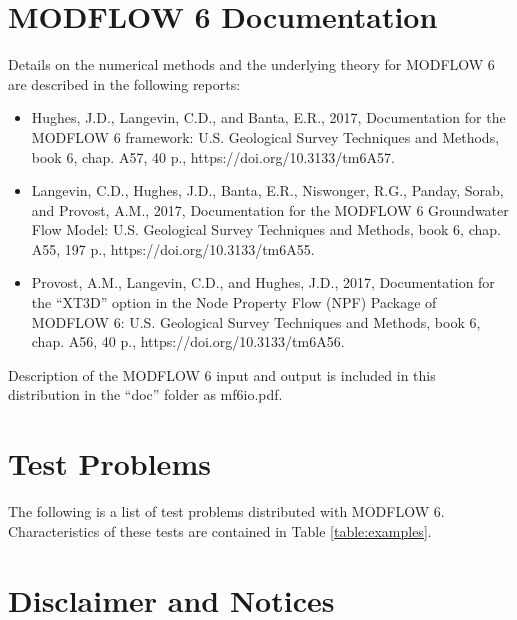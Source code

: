 \documentclass[11pt,twoside,twocolumn]{usgsreport}
\begin{document}
\section{MODFLOW 6 Documentation}
Details on the numerical methods and the underlying theory for MODFLOW 6 are described in the following reports:

\begin{itemize}
\item
Hughes, J.D., Langevin, C.D., and Banta, E.R., 2017, Documentation for the MODFLOW 6 framework: U.S. Geological Survey Techniques and Methods, book 6, chap. A57, 40 p., https://doi.org/10.3133/tm6A57.

\item
Langevin, C.D., Hughes, J.D., Banta, E.R., Niswonger, R.G., Panday, Sorab, and Provost, A.M., 2017, Documentation for the MODFLOW 6 Groundwater Flow Model: U.S. Geological Survey Techniques and Methods, book 6, chap. A55, 197 p., https://doi.org/10.3133/tm6A55.

\item
Provost, A.M., Langevin, C.D., and Hughes, J.D., 2017, Documentation for the ``XT3D'' option in the Node Property Flow (NPF) Package of MODFLOW 6: U.S. Geological Survey Techniques and Methods, book 6, chap. A56, 40 p., https://doi.org/10.3133/tm6A56.

\end{itemize}
 
\noindent Description of the MODFLOW 6 input and output is included in this distribution in the ``doc'' folder as mf6io.pdf.

\section{Test Problems}
The following is a list of test problems distributed with MODFLOW 6.  Characteristics of these tests are contained in Table \ref{table:examples}.







\section{Disclaimer and Notices}
\end{document}

